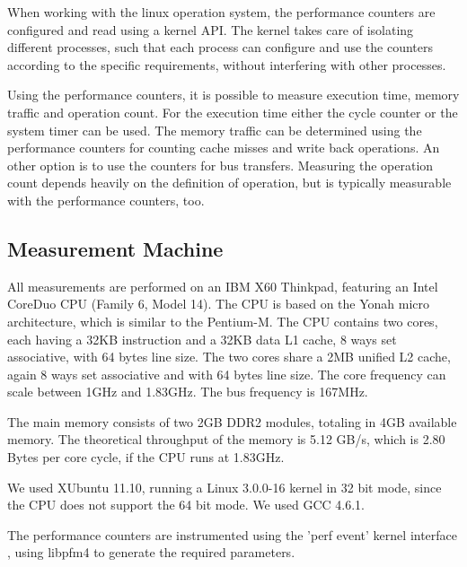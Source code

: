 \documentclass[a4paper,12pt]{article}
\begin{document}
When working with the linux operation system, the performance counters are
configured and read using a kernel API. The kernel takes care of isolating
different processes, such that each process can configure and use the counters
according to the specific requirements, without interfering with other processes.

Using the performance counters, it is possible to measure execution time, memory
traffic and operation count. For the execution time either the cycle counter or
the system timer can be used. The memory traffic can be determined using the
performance counters for counting cache misses and write back operations. An
other option is to use the counters for bus transfers. Measuring the operation count
depends heavily on the definition of operation, but is typically measurable with
the performance counters, too.

\subsection{Measurement Machine}
\label{sec:MeasurementMachine}
All measurements are performed on an IBM X60 Thinkpad, featuring an Intel
CoreDuo CPU (Family 6, Model 14). The CPU is based on the Yonah
micro architecture, which is similar to the Pentium-M. The CPU contains two
cores, each having a 32KB instruction and a 32KB data L1 cache, 8 ways set associative,
with 64 bytes line size. The two cores share a 2MB unified L2 cache, again 8
ways set associative and with 64 bytes line size. The core frequency can scale
between 1GHz and 1.83GHz. The bus frequency is 167MHz. 

The main memory consists of two 2GB DDR2 modules, totaling in 4GB available
memory. The theoretical throughput of the memory is 5.12 GB/s, which is 2.80
Bytes per core cycle, if the CPU runs at 1.83GHz.

We used XUbuntu 11.10, running a Linux 3.0.0-16 kernel in 32 bit mode, since
the CPU does not support the 64 bit mode. We used GCC 4.6.1.

The performance counters are instrumented using the 'perf event' kernel
interface \cite{unoffPerfEventsWebPage}, using libpfm4  \cite{libpfm4Docu} to
generate the required parameters.
\end{document}
